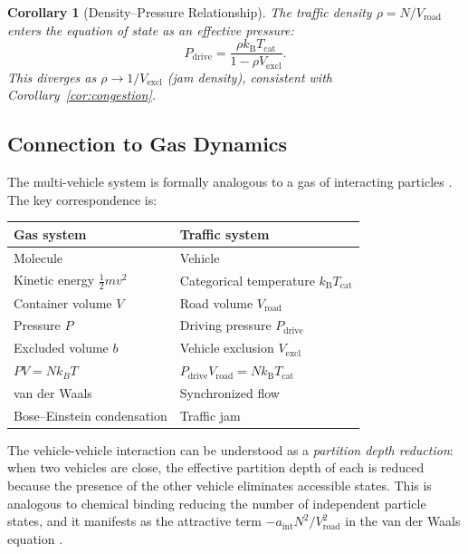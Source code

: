 \documentclass[twocolumn,10pt]{article}
\newtheorem{corollary}[theorem]{Corollary}
\newcommand{\kB}{k_{\mathrm{B}}}
\newcommand{\Tcat}{T_{\mathrm{cat}}}
\newcommand{\Pdrive}{P_{\mathrm{drive}}}
\newcommand{\Vroad}{V_{\mathrm{road}}}
\newcommand{\Vexcl}{V_{\mathrm{excl}}}
\begin{document}
\begin{corollary}[Density--Pressure Relationship]\label{cor:density}
The traffic density $\rho = N / \Vroad$ enters the equation of state as an effective pressure:
\begin{equation}
\Pdrive = \frac{\rho \kB \Tcat}{1 - \rho \Vexcl}.
\end{equation}
This diverges as $\rho \to 1/\Vexcl$ (jam density), consistent with Corollary~\ref{cor:congestion}.
\end{corollary}

\subsection{Connection to Gas Dynamics}

The multi-vehicle system is formally analogous to a gas of interacting particles \cite{boltzmann1896, landau1980}. The key correspondence is:
\begin{center}
\begin{tabular}{ll}
\toprule
\textbf{Gas system} & \textbf{Traffic system} \\
\midrule
Molecule & Vehicle \\
Kinetic energy $\frac{1}{2}mv^2$ & Categorical temperature $\kB\Tcat$ \\
Container volume $V$ & Road volume $\Vroad$ \\
Pressure $P$ & Driving pressure $\Pdrive$ \\
Excluded volume $b$ & Vehicle exclusion $\Vexcl$ \\
$PV = Nk_BT$ & $\Pdrive \Vroad = N\kB\Tcat$ \\
van der Waals & Synchronized flow \\
Bose--Einstein condensation & Traffic jam \\
\bottomrule
\end{tabular}
\end{center}

The vehicle-vehicle interaction can be understood as a \emph{partition depth reduction}: when two vehicles are close, the effective partition depth of each is reduced because the presence of the other vehicle eliminates accessible states. This is analogous to chemical binding reducing the number of independent particle states, and it manifests as the attractive term $-a_{\mathrm{int}} N^2 / \Vroad^2$ in the van der Waals equation \cite{sachikonye2026gas}.
\end{document}
